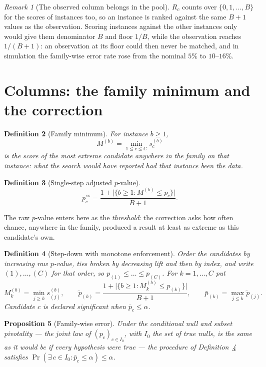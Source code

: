 \documentclass[11pt,a4paper]{article}
\newtheorem{definition}{Definition}[section]
\newtheorem{proposition}[definition]{Proposition}
\theoremstyle{remark}
\newtheorem{remark}[definition]{Remark}
\newcommand{\adj}{\bar p}
\begin{document}
\begin{remark}[The observed column belongs in the pool]
\label{rem:pool}
$R_c$ counts over $\{0,1,\dots,B\}$ for the scores of instances too, so an
instance is ranked against the same $B+1$ values as the observation. Scoring
instances against the other instances only would give them denominator $B$ and
floor $1/B$, while the observation reaches $1/(B+1)$: an observation at its
floor could then never be matched, and in simulation the family-wise error rate
rose from the nominal $5\%$ to $10$--$16\%$.
\end{remark}

\section{Columns: the family minimum and the correction}
\label{sec:adj}

\begin{definition}[Family minimum]
For instance $b\ge1$,
\[
  M^{(b)}=\min_{1\le c\le C}s_c^{(b)}
\]
is the score of the most extreme candidate anywhere in the family on that
instance: what the search would have reported had that instance been the data.
\end{definition}

\begin{definition}[Single-step adjusted $p$-value]
\label{def:single}
\[
  \adj^{\,\mathrm{ss}}_c=\frac{1+\bigl|\{b\ge1: M^{(b)}\le p_c\}\bigr|}{B+1}.
\]
\end{definition}

The raw $p$-value enters here as the \emph{threshold}: the correction asks how
often chance, anywhere in the family, produced a result at least as extreme as
this candidate's own.

\begin{definition}[Step-down with monotone enforcement]
\label{def:stepdown}
Order the candidates by increasing raw $p$-value, ties broken by decreasing
lift and then by index, and write $(1),\dots,(C)$ for that order, so
$p_{(1)}\le\dots\le p_{(C)}$. For $k=1,\dots,C$ put
\[
  M^{(b)}_k=\min_{j\ge k}s_{(j)}^{(b)},
  \qquad
  \tilde p_{(k)}=\frac{1+\bigl|\{b\ge1:M^{(b)}_k\le p_{(k)}\}\bigr|}{B+1},
  \qquad
  \adj_{(k)}=\max_{j\le k}\tilde p_{(j)}.
\]
Candidate $c$ is declared significant when $\adj_c\le\alpha$.
\end{definition}

\begin{proposition}[Family-wise error]
Under the conditional null and subset pivotality --- the joint law of
$(p_c)_{c\in I_0}$, with $I_0$ the set of true nulls, is the same as it would
be if every hypothesis were true --- the procedure of
Definition~\ref{def:stepdown} satisfies
$\Pr(\exists\,c\in I_0:\adj_c\le\alpha)\le\alpha$.
\end{proposition}
\end{document}
